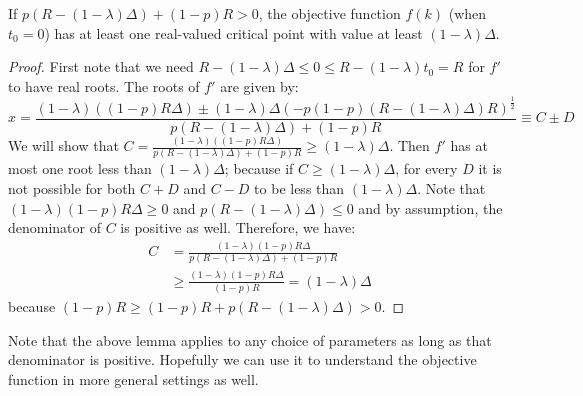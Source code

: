 \begin{lemma}
If $p(R-(1-\lambda)\Delta)+(1-p)R > 0$, the objective function $f(k)$ (when $t_0 = 0$) has at least one real-valued critical point with value at least $(1-\lambda)\Delta$.
\end{lemma}
\begin{proof}
First note that we need $R-(1-\lambda)\Delta \leq 0 \leq R-(1-\lambda)t_0 = R$ for $f'$ to have real roots. The roots of $f'$ are given by:
\begin{equation*}
x = \frac{(1-\lambda)((1-p)R\Delta) \pm (1-\lambda)\Delta(-p(1-p)(R-(1-\lambda)\Delta)R)^{\frac{1}{2}}}{p(R-(1-\lambda)\Delta)+(1-p)R} \equiv C\pm D
\end{equation*}
We will show that $C = 
\frac{(1-\lambda)((1-p)R\Delta)}{p(R-(1-\lambda)\Delta)+(1-p)R} \geq (1-\lambda) \Delta$. Then $f'$ has at most one root less than $(1-\lambda)\Delta$; because if $C \geq (1-\lambda)\Delta$, for every $D$ it is not possible for both $C+D$ and $C-D$ to be less than $(1-\lambda)\Delta$. Note that $(1-\lambda)(1-p)R\Delta \geq 0$ and $p(R-(1-\lambda)\Delta) \leq 0$ and by assumption, the denominator of $C$ is positive as well. Therefore, we have:
\begin{align*}
C &= \frac{(1-\lambda)(1-p)R\Delta}{p(R-(1-\lambda)\Delta)+(1-p)R} \\
&\geq \frac{(1-\lambda)(1-p)R\Delta}{(1-p)R} = (1-\lambda)\Delta
\end{align*}
because $(1-p)R \geq (1-p)R+p(R-(1-\lambda)\Delta) > 0$.
\end{proof}

Note that the above lemma applies to any choice of parameters as long as that denominator is positive. Hopefully we can use it to understand the objective function in more general settings as well.

